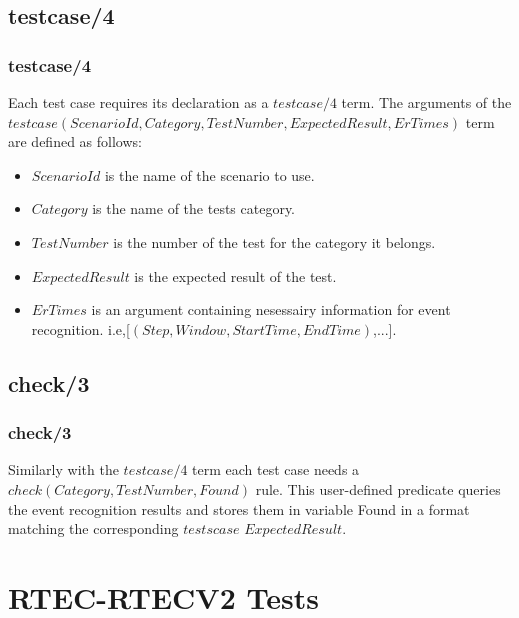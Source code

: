\documentclass[8pt]{beamer}
\begin{document}
\subsection{testcase/4}
\begin{frame}
    \frametitle{testcase/4}

    Each test case requires its declaration as a $\mathit{testcase/4}$ term. The arguments of the $\mathit{testcase(ScenarioId,Category,TestNumber,ExpectedResult,ErTimes)}$ term are defined as follows:
    \begin{itemize}
        \item $\mathit{ScenarioId}$ is the name of the scenario to use.
        \item $\mathit{Category}$ is the name of the tests category.
        \item $\mathit{TestNumber}$ is the number of the test for the category it belongs.
        \item $\mathit{ExpectedResult}$ is the expected result of the test.
        \item $\mathit{ErTimes}$ is an argument containing nesessairy information for event recognition.
            i.e,[$(Step,Window,StartTime,EndTime)$,...].
    \end{itemize}
\end{frame}

\subsection{check/3}
\begin{frame}

    \frametitle{check/3}
    Similarly with the $\mathit{testcase/4}$ term each test case needs a $\mathit{check(Category,TestNumber,Found)}$ rule. This user-defined predicate queries the event recognition results and stores them in variable Found in a format matching the corresponding $\mathit{testscase}$ $\mathit{ExpectedResult}$.
\end{frame}


\section{RTEC-RTECV2 Tests}
\end{document}

